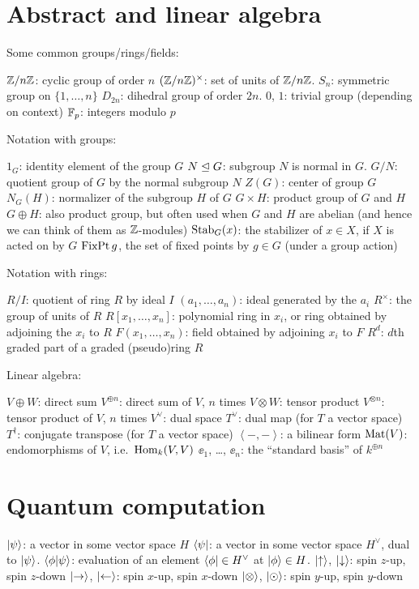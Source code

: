 \section{Abstract and linear algebra}
Some common groups/rings/fields:
\begin{itemize}
	\ii $\mathbb Z/n\mathbb Z$: cyclic group of order $n$
	\ii $(\mathbb Z/n\mathbb Z)^\times$: set of units of $\mathbb Z/n\mathbb Z$.
	\ii $S_n$: symmetric group on $\{1, \dots, n\}$
	\ii $D_{2n}$: dihedral group of order $2n$.
	\ii $0$, $1$: trivial group (depending on context)
	\ii $\mathbb F_p$: integers modulo $p$
\end{itemize}
Notation with groups:
\begin{itemize}
	\ii $1_G$: identity element of the group $G$
	\ii $N \trianglelefteq G$: subgroup $N$ is normal in $G$.
	\ii $G/N$: quotient group of $G$ by the normal subgroup $N$
	\ii $Z(G)$: center of group $G$
	\ii $N_G(H)$: normalizer of the subgroup $H$ of $G$
	\ii $G \times H$: product group of $G$ and $H$
	\ii $G \oplus H$: also product group,
	but often used when $G$ and $H$ are abelian
	(and hence we can think of them as $\mathbb Z$-modules)
	\ii $\operatorname{Stab}_G(x)$: the stabilizer of $x \in X$, if $X$ is acted on by $G$
	\ii $\operatorname{FixPt} g$, the set of fixed points by $g \in G$ (under a group action)
\end{itemize}
Notation with rings:
\begin{itemize}
	\ii $R/I$: quotient of ring $R$ by ideal $I$
	\ii $(a_1, \dots, a_n)$: ideal generated by the $a_i$
	\ii $R^\times$: the group of units of $R$
	\ii $R[x_1, \dots, x_n]$: polynomial ring in $x_i$,
	or ring obtained by adjoining the $x_i$ to $R$
	\ii $F(x_1, \dots, x_n)$: field obtained by adjoining $x_i$ to $F$
	\ii $R^d$: $d$th graded part of a graded (pseudo)ring $R$
\end{itemize}
Linear algebra:
\begin{itemize}
	\ii $V \oplus W$: direct sum
	\ii $V^{\oplus n}$: direct sum of $V$, $n$ times
	\ii $V \otimes W$: tensor product
	\ii $V^{\otimes n}$: tensor product of $V$, $n$ times
	\ii $V^\vee$: dual space
	\ii $T^\vee$: dual map (for $T$ a vector space)
	\ii $T^\dagger$: conjugate transpose (for $T$ a vector space)
	\ii $\left< -,-\right>$: a bilinear form
	\ii $\mathrm{Mat}(V)$: endomorphisms of $V$, i.e.\ $\operatorname{Hom}_k(V,V)$
	\ii $\ee_1$, \dots, $\ee_n$: the ``standard basis'' of $k^{\oplus n}$
\end{itemize}
\section{Quantum computation}
\begin{itemize}
	\ii $\ket{\psi}$: a vector in some vector space $H$
	\ii $\bra{\psi}$: a vector in some vector space $H^\vee$, dual to $\ket{\psi}$.
	\ii $\braket{\phi|\psi}$: evaluation of an element $\bra{\phi} \in H^\vee$ at $\ket{\phi} \in H$.
	\ii $\ket\uparrow$, $\ket\downarrow$: spin $z$-up, spin $z$-down
	\ii $\ket\rightarrow$, $\ket\leftarrow$: spin $x$-up, spin $x$-down
	\ii $\ket\otimes$, $\ket\odot$: spin $y$-up, spin $y$-down
\end{itemize}

